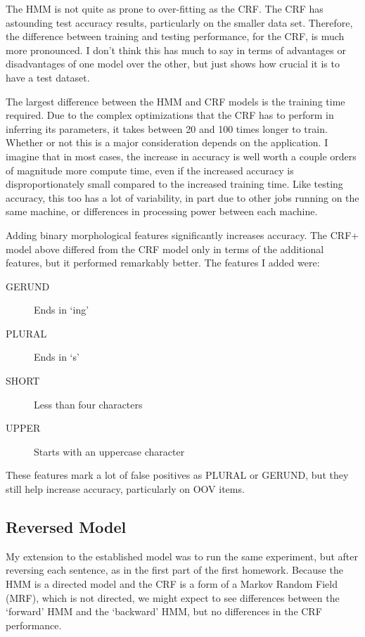 \documentclass[10pt]{article}\usepackage{graphicx, color}
\begin{document}
The HMM is not quite as prone to over-fitting as the CRF. The CRF has astounding test accuracy results, particularly on the smaller data set. Therefore, the difference between training and testing performance, for the CRF, is much more pronounced. I don't think this has much to say in terms of advantages or disadvantages of one model over the other, but just shows how crucial it is to have a test dataset.

The largest difference between the HMM and CRF models is the training time required. Due to the complex optimizations that the CRF has to perform in inferring its parameters, it takes between 20 and 100 times longer to train. Whether or not this is a major consideration depends on the application. I imagine that in most cases, the increase in accuracy is well worth a couple orders of magnitude more compute time, even if the increased accuracy is disproportionately small compared to the increased training time. Like testing accuracy, this too has a lot of variability, in part due to other jobs running on the same machine, or differences in processing power between each machine.


Adding binary morphological features significantly increases accuracy. The CRF+ model above differed from the CRF model only in terms of the additional features, but it performed remarkably better. The features I added were:
\begin{description}
  \item[GERUND] Ends in `ing'
  \item[PLURAL] Ends in `s'
  \item[SHORT] Less than four characters
  \item[UPPER] Starts with an uppercase character
\end{description}
These features mark a lot of false positives as PLURAL or GERUND, but they still help increase accuracy, particularly on OOV items.

\subsection{Reversed Model}

My extension to the established model was to run the same experiment, but after reversing each sentence, as in the first part of the first homework.
Because the HMM is a directed model and the CRF is a form of a Markov Random Field (MRF), which is not directed, we might expect to see differences between the `forward' HMM and the `backward' HMM, but no differences in the CRF performance.
\end{document}
